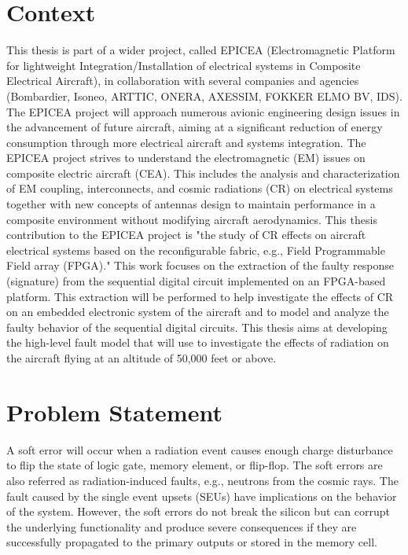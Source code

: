 
\section{Context}
\label{introduction}
This thesis is part of a wider project, called EPICEA (Electromagnetic Platform for lightweight 
Integration/Installation of electrical systems in Composite Electrical Aircraft), in collaboration with several 
companies and agencies (Bombardier, Isoneo, ARTTIC, ONERA, AXESSIM, FOKKER ELMO BV, IDS). The EPICEA project will approach
numerous avionic engineering design issues in the advancement of future aircraft, aiming at a significant
reduction of energy consumption through more electrical aircraft and systems integration. The EPICEA project strives to understand the electromagnetic (EM) issues on composite electric aircraft (CEA). This includes the analysis
and characterization of EM coupling, interconnects, and cosmic radiations (CR) on electrical systems together
with new concepts of antennas design to maintain performance in a composite environment without modifying
aircraft aerodynamics.
This thesis contribution to the EPICEA project is "the study of CR effects on aircraft electrical systems based on the reconfigurable fabric, e.g., Field Programmable Field array (FPGA)." This work focuses on the extraction of the faulty response (signature) from the sequential digital circuit implemented on an FPGA-based platform. This extraction will be performed to help investigate the effects of CR on an embedded electronic system of the aircraft and to model and analyze the faulty behavior of the sequential digital circuits. This thesis aims at developing the high-level fault model that will use to investigate the effects of radiation on the aircraft flying at an altitude of 50,000 feet or above. 
\section{Problem Statement}
A soft error will occur when a radiation event causes enough charge disturbance to flip the state of logic gate, memory element, or flip-flop. The soft errors are also referred as radiation-induced faults, e.g., neutrons from the cosmic rays. The fault caused by the single event upsets (SEUs) have implications on the behavior of the system. However, the soft errors do not break the silicon but can corrupt the underlying functionality and produce severe consequences if they are successfully propagated to the primary outputs or stored in the memory cell.

